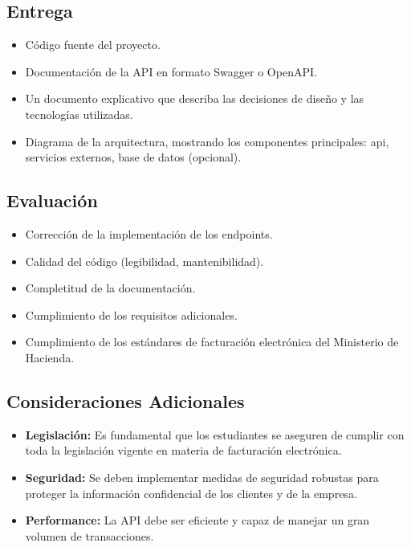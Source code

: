 \documentclass[
]{agujournal2019}
\begin{document}
\subsection{Entrega}\label{entrega-1}

\begin{itemize}
\item
  Código fuente del proyecto.
\item
  Documentación de la API en formato Swagger o OpenAPI.
\item
  Un documento explicativo que describa las decisiones de diseño y las
  tecnologías utilizadas.
\item
  Diagrama de la arquitectura, mostrando los componentes principales:
  api, servicios externos, base de datos (opcional).
\end{itemize}

\subsection{Evaluación}\label{evaluaciuxf3n-1}

\begin{itemize}
\item
  Corrección de la implementación de los endpoints.
\item
  Calidad del código (legibilidad, mantenibilidad).
\item
  Completitud de la documentación.
\item
  Cumplimiento de los requisitos adicionales.
\item
  Cumplimiento de los estándares de facturación electrónica del
  Ministerio de Hacienda.
\end{itemize}

\subsection{Consideraciones
Adicionales}\label{consideraciones-adicionales-1}

\begin{itemize}
\item
  \textbf{Legislación:} Es fundamental que los estudiantes se aseguren
  de cumplir con toda la legislación vigente en materia de facturación
  electrónica.
\item
  \textbf{Seguridad:} Se deben implementar medidas de seguridad robustas
  para proteger la información confidencial de los clientes y de la
  empresa.
\item
  \textbf{Performance:} La API debe ser eficiente y capaz de manejar un
  gran volumen de transacciones.
\end{itemize}
\end{document}
